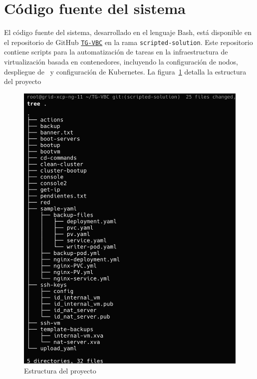 \section{Código fuente del sistema}
\noindent
El código fuente del sistema, desarrollado en el lenguaje Bash, está disponible en el repositorio de GitHub \href{https://github.com/AariazP/TG-VBC.git}{\texttt{TG-VBC}} en la rama \texttt{scripted-solution}. Este repositorio contiene scripts para la automatización de tareas en la infraestructura de virtualización basada en contenedores, incluyendo la configuración de nodos, despliegue de \VM\ y configuración de Kubernetes. 
La figura~\ref{fig:estructura-proyecto} detalla la estructura del proyecto
\begin{figure}[H]
    \centering
    \includegraphics[scale=0.3]{tablas-images/cp6/src/tree.png}
    \caption{Estructura del proyecto}\label{fig:estructura-proyecto}
\end{figure}